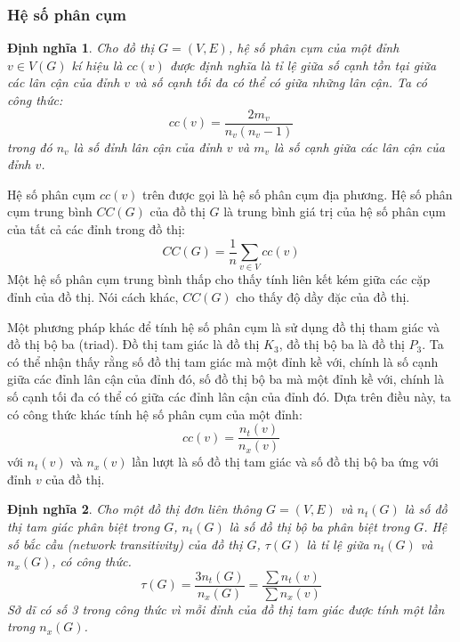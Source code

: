 \documentclass[14pt, oneside, a4paper, openany]{scrartcl}
\newtheorem{definition}{Định nghĩa}[section]
\begin{document}
\subsubsection{Hệ số phân cụm}
\begin{definition}
	\cite{complexnetwork}Cho đồ thị $G = (V,E)$, hệ số phân cụm  của một đỉnh $v \in V(G)$ kí hiệu là $cc(v)$ được định nghĩa là tỉ lệ giữa số cạnh tồn tại giữa các lân cận của đỉnh $v$ và số cạnh tối đa có thể có giữa những lân cận. Ta có công thức:
	\begin{equation}
	cc(v) = \frac{2m_v}{n_v(n_v-1)}
	\end{equation}
	trong đó $n_v$ là số đỉnh lân cận của đỉnh $v$ và $m_v$ là số cạnh giữa các lân cận của đỉnh $v$.
\end{definition}

Hệ số phân cụm $cc(v)$ trên được gọi là hệ số phân cụm địa phương. Hệ số phân cụm trung bình $CC(G)$ của đồ thị $G$ là trung bình giá trị của hệ số phân cụm của tất cả các đỉnh trong đồ thị:
\begin{equation}
CC(G) = \frac{1}{n}\sum_{v \in V}cc(v)
\end{equation}
Một hệ số phân cụm trung bình thấp cho thấy tính liên kết kém giữa các cặp đỉnh của đồ thị. Nói cách khác, $CC(G)$ cho thấy độ dầy đặc của đồ thị.

Một phương pháp khác để tính hệ số phân cụm là sử dụng đồ thị tham giác và đồ thị bộ ba (triad). Đồ thị tam giác là đồ thị $K_3$, đồ thị bộ ba là đồ thị $P_3$. Ta có thể nhận thấy rằng số đồ thị tam giác mà một đỉnh kề với, chính là số cạnh giữa các đỉnh lân cận của đỉnh đó, số đồ thị bộ ba mà một đỉnh kề với, chính là số cạnh tối đa có thể có giữa các đỉnh lân cận của đỉnh đó.
Dựa trên điều này, ta có công thức khác tính hệ số phân cụm của một đỉnh:
\begin{equation}
cc(v) = \frac{n_t(v)}{n_x(v)}
\end{equation}
với $n_t(v)$ và $n_x(v)$ lần lượt là số đồ thị tam giác và số đồ thị bộ ba ứng với đỉnh $v$ của đồ thị.

\begin{definition}
	\cite{complexnetwork} Cho một đồ thị đơn liên thông $G = (V,E)$ và $n_t(G)$ là số đồ thị tam giác phân biệt trong $G$, $n_t(G)$ là số đồ thị bộ ba phân biệt trong $G$. Hệ số bắc cầu  (network transitivity) của đồ thị $G$, $\tau(G)$ là tỉ lệ giữa $n_t(G)$ và $n_x(G)$, có công thức.
	\begin{equation}
	\tau(G) = \frac{3n_t(G)}{n_x(G)} = \frac{\sum n_t(v)}{\sum n_x(v)}
	\end{equation}
	Sở dĩ có số 3 trong công thức vì mỗi đỉnh của đồ thị tam giác được tính một lần trong $n_x(G)$.
\end{definition}
\end{document}

